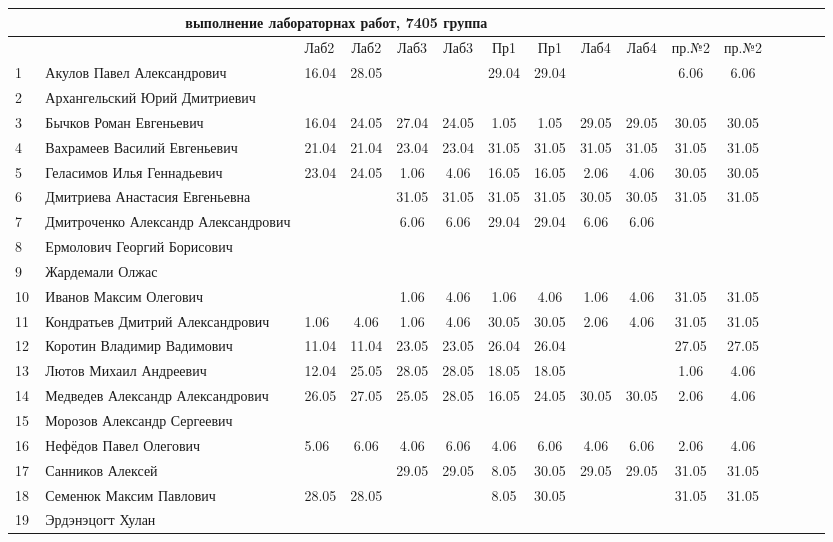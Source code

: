\documentclass[a4paper,11pt]{article}
\begin{document}
\newpage
{}
\recalctypearea
%
\hspace{-6.4cm} %
\begin{tabular}{l|llccccccccccccc}
\multicolumn{10}{c}{выполнение лабораторнах работ, 7405 группа} \\
\toprule
	                                  &&Лаб2&Лаб2 & Лаб3&Лаб3 & Пр1 &Пр1  & Лаб4 &Лаб4&пр.№2&пр.№2\\
\midrule
1\,&Акулов Павел Александрович             &16.04&28.05&     &     &29.04&29.04&      &    &6.06& 6.06\\
2\,&Архангельский Юрий Дмитриевич         &     &     &     &     &&&&\\
3\,&Бычков Роман Евгеньевич               &16.04&24.05&27.04&24.05& 1.05& 1.05&29.05 &29.05&30.05&30.05\\
4\,&Вахрамеев Василий Евгеньевич          &21.04&21.04&23.04&23.04&31.05&31.05&31.05 &31.05&31.05&31.05\\
5\,&Геласимов Илья Геннадьевич            &23.04&24.05& 1.06& 4.06&16.05&16.05& 2.06 & 4.06&30.05&30.05\\
\midrule
6\,&Дмитриева Анастасия Евгеньевна        &     &     &31.05&31.05&31.05&31.05&30.05&30.05&31.05&31.05\\
7\,&Дмитроченко Александр Александрович   &     &     & 6.06& 6.06&29.04&29.04& 6.06& 6.06&\\
8\,&Ермолович Георгий Борисович           &     &     &     &     &&&&\\
9\,&Жардемали Олжас                       &     &     &     &     &&&&\\
10\,&Иванов Максим Олегович               &     &     & 1.06& 4.06& 1.06& 4.06& 1.06& 4.06&31.05&31.05\\
\midrule
11\,&Кондратьев Дмитрий Александрович     & 1.06& 4.06& 1.06& 4.06&30.05&30.05& 2.06& 4.06&31.05&31.05\\
12\,&Коротин Владимир Вадимович           &11.04&11.04&23.05&23.05&26.04&26.04&     &     &27.05&27.05&\\
13\,&Лютов Михаил Андреевич               &12.04&25.05&28.05&28.05&18.05&18.05&     &     & 1.06& 4.06\\
14\,&Медведев Александр Александрович     &26.05&27.05&25.05&28.05&16.05&24.05&30.05&30.05& 2.06& 4.06\\
15\,&Морозов Александр Сергеевич          &&&&&&&&\\
\midrule
16\,&Нефёдов Павел Олегович               & 5.06& 6.06& 4.06& 6.06& 4.06& 6.06& 4.06& 6.06&2.06& 4.06\\
17\,&Санников Алексей                     &     &     &29.05&29.05& 8.05&30.05&29.05&29.05&31.05&31.05\\
18\,&Семенюк Максим Павлович              &28.05&28.05&     &     & 8.05&30.05&     &     &31.05&31.05\\
19\,&Эрдэнэцогт Хулан                     &&&&&&&&\\
\bottomrule
\end{tabular}
\end{document}
